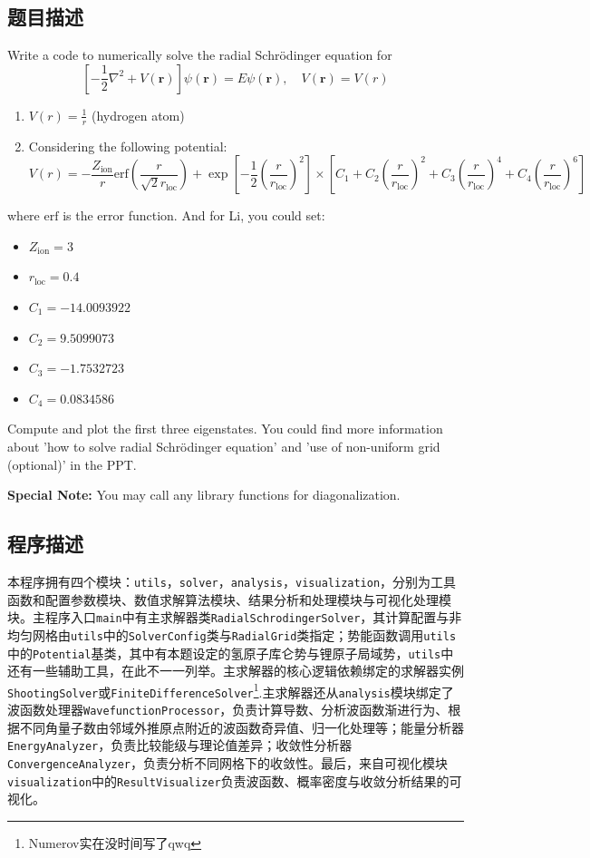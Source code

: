 \subsection{题目描述}
\noindent Write a code to numerically solve the radial Schrödinger equation for
\[
    \left[-\frac{1}{2}\nabla^2+V(\mathbf{r})\right]\psi(\mathbf{r})=E\psi(\mathbf{r}), \quad V(\mathbf{r})=V(r)
\]
\begin{enumerate}
    \item \( V(r) = \frac{1}{r} \) (hydrogen atom)
    \item Considering the following potential:
          \[
              V(r) = -\frac{Z_{\text{ion}}}{r}\text{erf}\left(\frac{r}{\sqrt{2} r_{\text{loc}}}\right)
              + \exp \left[ -\frac{1}{2} \left(\frac{r}{r_{\text{loc}}}\right)^{2}\right]
              \times \left[C_1 + C_2\left(\frac{r}{r_{\text{loc}}}\right)^2+C_3\left(\frac{r}{r_{\text{loc}}}\right)^4+C_4\left(\frac{r}{r_{\text{loc}}}\right)^6\right]
          \]
\end{enumerate}
where \(\text{erf}\) is the error function. And for Li, you could set:
\begin{itemize}
    \item \( Z_{\text{ion}}=3 \)
    \item \( r_{\text{loc}}=0.4 \)
    \item \( C_1=-14.0093922 \)
    \item \( C_2=9.5099073 \)
    \item \( C_3=-1.7532723 \)
    \item \( C_4=0.0834586 \)
\end{itemize}
\noindent Compute and plot the first three eigenstates. You could find more information about 'how to solve radial Schrödinger equation' and 'use of non-uniform grid (optional)' in the PPT.

\textbf{Special Note:} You may call any library functions for diagonalization.


\subsection{程序描述}
本程序拥有四个模块：\texttt{utils}，\texttt{solver}，\texttt{analysis}，\texttt{visualization}，分别为工具函数和配置参数模块、数值求解算法模块、结果分析和处理模块与可视化处理模块。主程序入口\texttt{main}中有主求解器类\texttt{RadialSchrodingerSolver}，其计算配置与非均匀网格由\texttt{utils}中的\texttt{SolverConfig}类与\texttt{RadialGrid}类指定；势能函数调用\texttt{utils}中的\texttt{Potential}基类，其中有本题设定的氢原子库仑势与锂原子局域势，\texttt{utils}中还有一些辅助工具，在此不一一列举。主求解器的核心逻辑依赖绑定的求解器实例\texttt{ShootingSolver}或\texttt{FiniteDifferenceSolver}\footnote{Numerov实在没时间写了qwq}.主求解器还从\texttt{analysis}模块绑定了波函数处理器\texttt{WavefunctionProcessor}，负责计算导数、分析波函数渐进行为、根据不同角量子数由邻域外推原点附近的波函数奇异值、归一化处理等；能量分析器\texttt{EnergyAnalyzer}，负责比较能级与理论值差异；收敛性分析器\texttt{ConvergenceAnalyzer}，负责分析不同网格下的收敛性。最后，来自可视化模块\texttt{visualization}中的\texttt{ResultVisualizer}负责波函数、概率密度与收敛分析结果的可视化。

